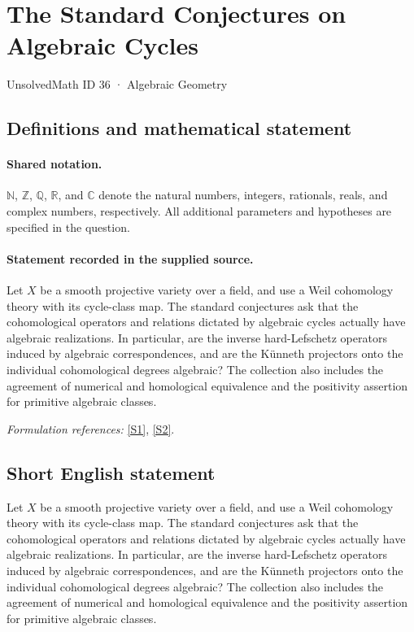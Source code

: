 \documentclass[11pt]{article}
\newcommand{\sref}[2]{\hyperlink{source:#1:#2}{[S#2]}}
\begin{document}
\setcounter{section}{35}
\section{The Standard Conjectures on Algebraic Cycles}\label{36}
{\small UnsolvedMath ID 36 · Algebraic Geometry}
\subsection{Definitions and mathematical statement}

\paragraph{Shared notation.}$\mathbb N$, $\mathbb Z$, $\mathbb Q$, $\mathbb R$, and $\mathbb C$ denote the natural numbers, integers, rationals, reals, and complex numbers, respectively. All additional parameters and hypotheses are specified in the question.


\paragraph{Statement recorded in the supplied source.}
Let $X$ be a smooth projective variety over a field, and use a Weil cohomology theory with its cycle-class map. The standard conjectures ask that the cohomological operators and relations dictated by algebraic cycles actually have algebraic realizations. In particular, are the inverse hard-Lefschetz operators induced by algebraic correspondences, and are the K\"unneth projectors onto the individual cohomological degrees algebraic? The collection also includes the agreement of numerical and homological equivalence and the positivity assertion for primitive algebraic classes.
\par\smallskip\textit{Formulation references:} \sref{36}{1}, \sref{36}{2}.
\subsection{Short English statement}
Let $X$ be a smooth projective variety over a field, and use a Weil cohomology theory with its cycle-class map. The standard conjectures ask that the cohomological operators and relations dictated by algebraic cycles actually have algebraic realizations. In particular, are the inverse hard-Lefschetz operators induced by algebraic correspondences, and are the K\"unneth projectors onto the individual cohomological degrees algebraic? The collection also includes the agreement of numerical and homological equivalence and the positivity assertion for primitive algebraic classes.
\end{document}
